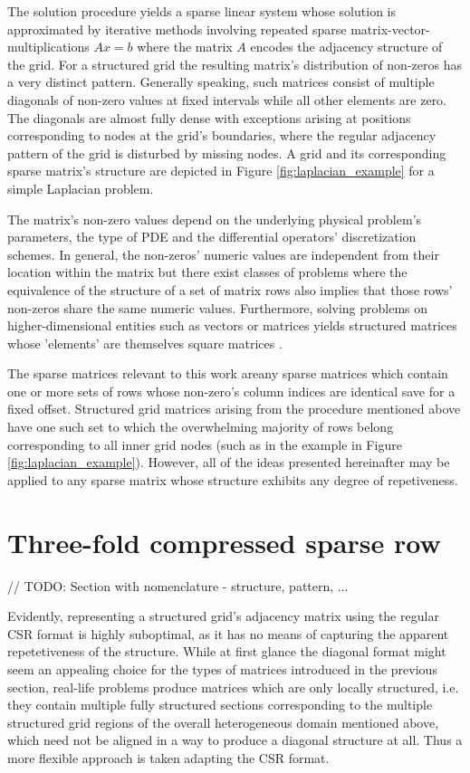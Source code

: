 \documentclass{article}
\begin{document}
    The solution procedure yields a sparse linear system whose solution is approximated by iterative methods involving repeated sparse matrix-vector-multiplications $Ax = b$ where the matrix $A$ encodes the adjacency structure of the grid. For a structured grid the resulting matrix's distribution of non-zeros has a very distinct pattern. Generally speaking, such matrices consist of multiple diagonals of non-zero values at fixed intervals while all other elements are zero. The diagonals are almost fully dense with exceptions arising at positions corresponding to nodes at the grid's boundaries, where the regular adjacency pattern of the grid is disturbed by missing nodes. A grid and its corresponding sparse matrix's structure are depicted in Figure \ref{fig:laplacian_example} for a simple Laplacian problem.

    The matrix's non-zero values depend on the underlying physical problem's parameters, the type of PDE and the differential operators' discretization schemes. In general, the non-zeros' numeric values are independent from their location within the matrix but there exist classes of problems where the equivalence of the structure of a set of matrix rows also implies that those rows' non-zeros share the same numeric values. Furthermore, solving problems on higher-dimensional entities such as vectors or matrices yields structured matrices whose 'elements' are themselves square matrices \cite{Godwin2013}.

    The sparse matrices relevant to this work areany sparse matrices which contain one or more sets of rows whose non-zero's column indices are identical save for a fixed offset. Structured grid matrices arising from the procedure mentioned above have one such set to which the overwhelming majority of rows belong corresponding to all inner grid nodes (such as in the example in Figure \ref{fig:laplacian_example}). However, all of the ideas presented hereinafter may be applied to any sparse matrix whose structure exhibits any degree of repetiveness.

\section{Three-fold compressed sparse row}

// TODO: Section with nomenclature
  - structure, pattern, ...

  Evidently, representing a structured grid's adjacency matrix using the regular CSR format is highly suboptimal, as it has no means of capturing the apparent repetetiveness of the structure. While at first glance the diagonal format might seem an appealing choice for the types of matrices introduced in the previous section, real-life problems produce matrices which are only locally structured, i.e. they contain multiple fully structured sections corresponding to the multiple structured grid regions of the overall heterogeneous domain mentioned above, which need not be aligned in a way to produce a diagonal structure at all. Thus a more flexible approach is taken adapting the CSR format.
\end{document}
